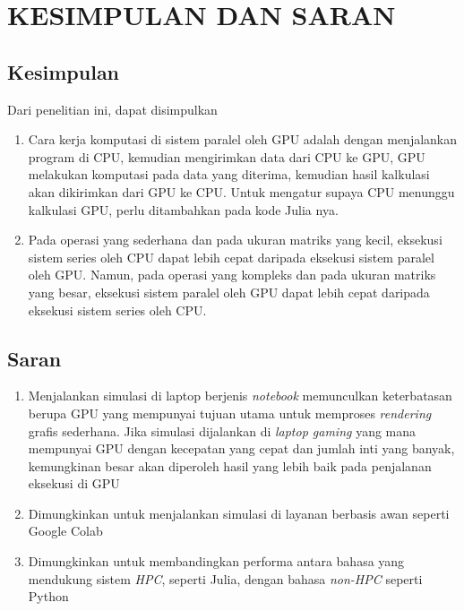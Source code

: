 \chapter{KESIMPULAN DAN SARAN}
\section{Kesimpulan}
Dari penelitian ini, dapat disimpulkan
\begin{enumerate}
	\item Cara kerja komputasi di sistem paralel oleh GPU adalah dengan menjalankan program di CPU, kemudian mengirimkan data dari CPU ke GPU, GPU melakukan komputasi pada data yang diterima, kemudian hasil kalkulasi akan dikirimkan dari GPU ke CPU. Untuk mengatur supaya CPU menunggu kalkulasi GPU, perlu ditambahkan  pada kode Julia nya.
	\item Pada operasi yang sederhana dan pada ukuran matriks yang kecil, eksekusi sistem series oleh CPU dapat lebih cepat daripada eksekusi sistem paralel oleh GPU. Namun, pada operasi yang kompleks dan pada ukuran matriks yang besar, eksekusi sistem paralel oleh GPU dapat lebih cepat daripada eksekusi sistem series oleh CPU.
\end{enumerate}

\section{Saran}
\begin{enumerate}
	\item Menjalankan simulasi di laptop berjenis \emph{notebook} memunculkan keterbatasan berupa GPU yang mempunyai tujuan utama untuk memproses \emph{rendering} grafis sederhana. Jika simulasi dijalankan di \emph{laptop gaming} yang mana mempunyai GPU dengan kecepatan yang cepat dan jumlah inti yang banyak, kemungkinan besar akan diperoleh hasil yang lebih baik pada penjalanan eksekusi di GPU
	\item Dimungkinkan untuk menjalankan simulasi di layanan berbasis awan seperti Google Colab
	\item Dimungkinkan untuk membandingkan performa antara bahasa yang mendukung sistem \emph{HPC}, seperti Julia, dengan bahasa \emph{non-HPC} seperti Python
\end{enumerate}

